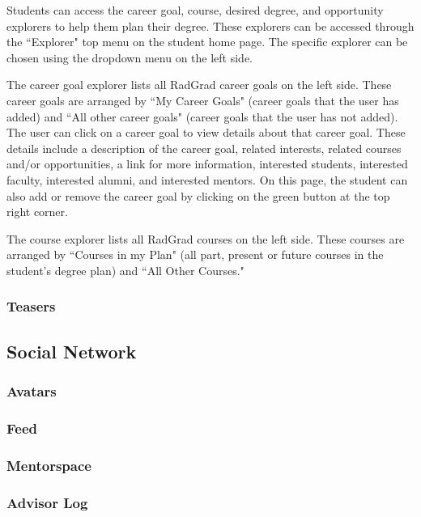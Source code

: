 Students can access the career goal, course, desired degree, and opportunity explorers to help them plan their degree.  These explorers can be accessed through the ``Explorer" top menu on the student home page. The specific explorer can be chosen using the dropdown menu on the left side. 

The career goal explorer lists all RadGrad career goals on the left side. These career goals are arranged by ``My Career Goals" (career goals that the user has added) and ``All other career goals" (career goals that the user has not added). The user can click on a career goal to view details about that career goal. These details include a description of the career goal, related interests, related courses and/or opportunities, a link for more information, interested students, interested faculty, interested alumni, and interested mentors. On this page, the student can also add or remove the career goal by clicking on the green button at the top right corner.  

The course explorer lists all RadGrad courses on the left side. These courses are arranged by ``Courses in my Plan" (all part, present or future courses in the student's degree plan) and ``All Other Courses."  

\subsubsection{Teasers}

\subsection{Social Network}
\subsubsection{Avatars}

\subsubsection{Feed}

\subsubsection{Mentorspace}

\subsubsection{Advisor Log}

